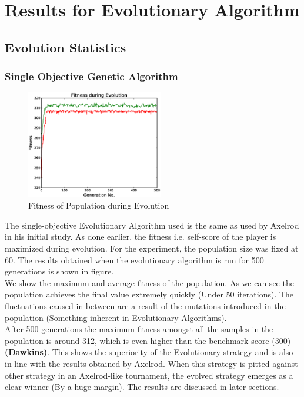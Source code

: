 \documentclass[a4paper]{article}
\begin{document}
	\section{Results for Evolutionary Algorithm}

	\subsection{Evolution Statistics}

	\subsubsection{Single Objective Genetic Algorithm}	

	\begin{figure}
	\centering
	\includegraphics[width=0.53\textwidth]{singFitPlot.eps}
	\caption{\footnotesize{Fitness of Population during Evolution}}
	\end{figure}
	The single-objective Evolutionary Algorithm used is the same as used by Axelrod in his initial study. As done earlier, the fitness i.e. self-score of the player is maximized during evolution. For the experiment, the population size was fixed at 60. The results obtained when the evolutionary algorithm is run for 500 generations is shown in figure.\\
	We show the maximum and average fitness of the population. As we can see the population achieves the final value extremely quickly (Under 50 iterations). The fluctuations caused in between are a result of the mutations introduced in the population (Something inherent in Evolutionary Algorithms).\\
	After 500 generations the maximum fitness amongst all the samples in the population is around 312, which is even higher than the benchmark score (300) \textbf{(Dawkins)}. This shows the superiority of the Evolutionary strategy and is also in line with the results obtained by Axelrod. When this strategy is pitted against other strategy in an Axelrod-like tournament, the evolved strategy emerges as a clear winner (By a huge margin). The results are discussed in later sections.	
\end{document}
